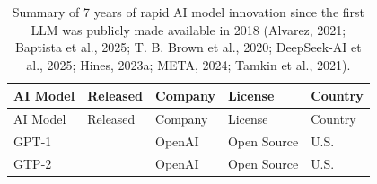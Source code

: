 \documentclass[
  12pt,
  letterpaper,
  DIV=11,
  numbers=noendperiod]{scrartcl}
\begin{document}
\begin{longtable}[]{@{}
  >{\raggedright\arraybackslash}p{}
  >{\raggedright\arraybackslash}p{}
  >{\raggedright\arraybackslash}p{}
  >{\raggedright\arraybackslash}p{}
  >{\raggedright\arraybackslash}p{}@{}}
\caption[7 Years of Rapid AI Model Innovation]{Summary of 7 years of
rapid AI model innovation since the first LLM was publicly made
available in 2018 (Alvarez, 2021; Baptista et al., 2025; T. B. Brown et
al., 2020; DeepSeek-AI et al., 2025; Hines, 2023a; META, 2024; Tamkin et
al., 2021).}\tabularnewline
\toprule\noalign{}
\begin{minipage}[b]{\linewidth}\raggedright
AI Model
\end{minipage} & \begin{minipage}[b]{\linewidth}\raggedright
Released
\end{minipage} & \begin{minipage}[b]{\linewidth}\raggedright
Company
\end{minipage} & \begin{minipage}[b]{\linewidth}\raggedright
License
\end{minipage} & \begin{minipage}[b]{\linewidth}\raggedright
Country
\end{minipage} \\
\midrule\noalign{}
\endfirsthead
\toprule\noalign{}
\begin{minipage}[b]{\linewidth}\raggedright
AI Model
\end{minipage} & \begin{minipage}[b]{\linewidth}\raggedright
Released
\end{minipage} & \begin{minipage}[b]{\linewidth}\raggedright
Company
\end{minipage} & \begin{minipage}[b]{\linewidth}\raggedright
License
\end{minipage} & \begin{minipage}[b]{\linewidth}\raggedright
Country
\end{minipage} \\
\midrule\noalign{}
\endhead
\bottomrule\noalign{}
\endlastfoot
GPT-1 & 2018 & OpenAI & Open Source & U.S. \\
GTP-2 & 2019 & OpenAI & Open Source & U.S. \\

\end{longtable}
\end{document}
